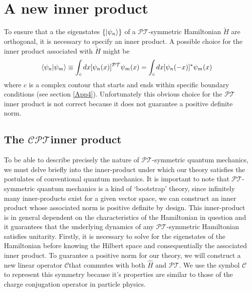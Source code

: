 \documentclass[12pt, a4paper]{report}
\newcommand\PT{\(\mathcal{PT}\)}
\newcommand\CC{\(\mathcal{C}\)}
\begin{document}
\section{A new inner product}\label{PTinnerp}
To ensure that a the eigenstates $\{\ket{\psi_n}\}$ of a \PT-symmetric Hamiltonian $\tilde{H}$ are orthogonal, it is necessary to specify an inner product. A possible choice for the inner product associated with $\tilde{H}$ might be\cite{PTsymmetricQM}
\begin{equation}\label{eq:1.3}
\braket{\psi_n|\psi_m} \equiv \int_{c} dx [\psi_{n}(x)]^{\mathcal{PT}}\psi_m(x) = \int_{c} dx [\psi_{n}(-x)]^{*}\psi_m(x)
\end{equation}
where $c$ is a complex contour that starts and ends within specific boundary conditions (see section \ref{App4}). Unfortunately this obvious choice for the \PT\:inner product is not correct because it does not guarantee a positive definite norm.

\subsection{The \texorpdfstring{$\mathcal{CPT}$}\:\:inner product}\label{CPT}
To be able to describe precisely the nature of \PT-symmetric quantum mechanics, we must delve briefly into the inner-product under which our theory satisfies the postulates of conventional quantum mechanics. It is important to note that \PT-symmetric quantum mechanics is a kind of `bootstrap' theory\cite{MakingSense}, since infinitely many inner-products exist for a given vector space, we can construct an inner product whose associated norm is positive definite by design. This inner-product is in general dependent on the characteristics of the Hamiltonian in question and it guarantees that the underlying dynamics of any \PT-symmetric Hamiltonian satisfies unitarity\cite{MustaHbeHermitian}.
Firstly, it is necessary to solve for the eigenstates of the Hamiltonian before knowing the Hilbert space and consequentially the associated inner product.
To guarantee a positive norm for our theory, we will construct a new linear operator \CC\:that commutes with both $\hat{H}$ and \PT. We use the symbol \CC\: to represent this symmetry because it's properties are similar to those of the charge conjugation operator in particle physics\cite{MakingSense}.

\end{document}
